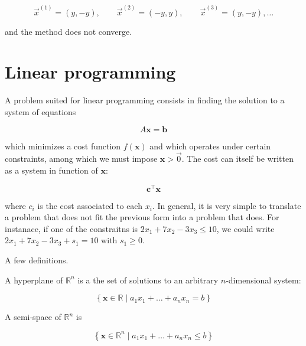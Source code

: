 \documentclass[12pt]{article}
\theoremstyle{definition}
\begin{document}
\begin{equation*}
    \overrightarrow{x}^{ (1) } = (y, -y), \qquad 
    \overrightarrow{x}^{ (2) } = (-y, y), \qquad 
    \overrightarrow{x}^{ (3) } = (y, -y), \ldots
\end{equation*}

and the method does not converge.













\pagebreak

\section{Linear programming}

A problem suited for linear programming consists in finding the solution to a
system of equations 

\begin{equation*}
    A\textbf{x} = \textbf{b}
\end{equation*}

which minimizes a cost function $f(\textbf{x})$ and which operates under certain
constraints, among which we must impose $\textbf{x} > \overrightarrow{0}$. The
cost can itself be written as a system in function of $\textbf{x}$:

\begin{equation*}
    \textbf{c}^\top \textbf{x}
\end{equation*}

where $c_i$ is the cost associated to each $x_i$. In general, it is very simple
to translate a problem that does not fit the previous form into a problem that
does. For instanace, if one of the constraitns is $2x_1 + 7x_2 - 3x_3 \leq 10$,
we could write $2x_1 + 7x_2 -3x_3 + s_1 = 10$  with $s_1 \geq 0$.

A few definitions. 

\begin{definition}
    A hyperplane of $\mathbb{R}^n$ is a the set of solutions to an arbitrary
    $n$-dimensional system: 

    \begin{equation*}
        \left\{ \textbf{x} \in \mathbb{R} \mid a_1x_1 + \ldots + a_nx_n = b \right\} 
    \end{equation*}

    A semi-space of $\mathbb{R}^n$ is 

    \begin{equation*}
        \left\{ \textbf{x} \in \mathbb{R}^n \mid a_1 x_1 + \ldots + a_n x_n \leq
        b\right\} 
    \end{equation*}
\end{definition}
\end{document}
